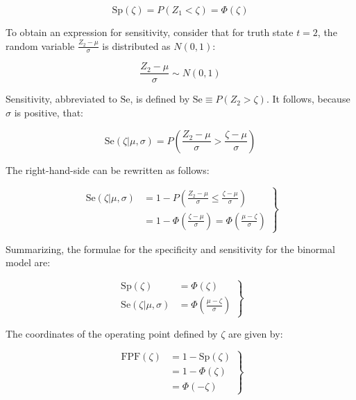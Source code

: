 \documentclass[
]{book}
\begin{document}
\begin{equation} 
\text{Sp}\left ( \zeta \right )=P\left ( Z_1 < \zeta \right )=\Phi\left ( \zeta \right )
\label{eq:binormal-model-specificity}
\end{equation}

To obtain an expression for sensitivity, consider that for truth state \(t = 2\), the random variable \(\frac{Z_2-\mu}{\sigma}\) is distributed as \(N(0,1)\):

\begin{equation*} 
\frac{Z_2-\mu}{\sigma}\sim N\left ( 0,1 \right )
\end{equation*}

Sensitivity, abbreviated to \(\text{Se}\), is defined by \(\text{Se} \equiv P\left ( Z_2 > \zeta \right )\). It follows, because \(\sigma\) is positive, that:

\begin{equation*} 
\text{Se}\left ( \zeta | \mu, \sigma \right ) = P\left ( \frac{Z_2-\mu}{\sigma} > \frac{\zeta-\mu}{\sigma} \right )
\end{equation*}

The right-hand-side can be rewritten as follows:

\begin{equation} 
\left. 
\begin{aligned}
\text{Se}\left ( \zeta | \mu, \sigma \right )&= 1 - P\left ( \frac{Z_2-\mu}{\sigma} \leq  \frac{\zeta-\mu}{\sigma} \right )\\
&=1-\Phi\left (  \frac{\zeta-\mu}{\sigma}\right )=\Phi\left (  \frac{\mu-\zeta}{\sigma}\right )
\end{aligned}
\right \}
\label{eq:binormal-model-sensitivity2}
\end{equation}

Summarizing, the formulae for the specificity and sensitivity for the binormal model are:

\begin{equation} 
\left. 
\begin{aligned}
\text{Sp}\left ( \zeta \right ) &= \Phi\left ( \zeta \right )\\
\text{Se}\left ( \zeta | \mu, \sigma \right ) &= \Phi\left (  \frac{\mu-\zeta}{\sigma}\right )
\end{aligned}
\right \}
\label{eq:binormal-model-se-sp}
\end{equation}

The coordinates of the operating point defined by \(\zeta\) are given by:

\begin{equation} 
\left. 
\begin{aligned}
\text{FPF}\left ( \zeta \right ) &= 1 - \text{Sp}\left ( \zeta \right ) \\
&= 1 - \Phi\left ( \zeta \right ) \\
&= \Phi\left ( -\zeta \right )
\end{aligned}
\right \}
\label{eq:binormal-model-fpf}
\end{equation}
\end{document}
